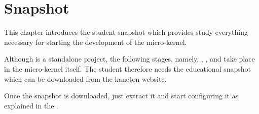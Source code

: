%
%
%
%
%
%

%
%

\chapter{Snapshot}
\label{chapter:snapshot}

This chapter introduces the student snapshot which provides study everything
necessary for starting the development of the  micro-kernel.

\newpage

%
%

Although  is a standalone project, the following stages, namely,
, ,  and  take place in the micro-kernel
itself. The student therefore needs the educational snapshot which can be
downloaded from the kaneton website.

Once the snapshot is downloaded, just extract it and start configuring it
as explained in the .
